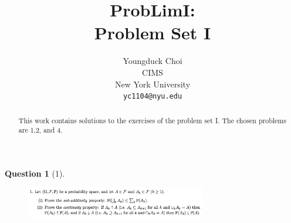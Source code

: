 \documentclass{article} %
\title{ProbLimI: \\
Problem Set I}
\author{
Youngduck Choi \\
CIMS \\
New York University\\
\texttt{yc1104@nyu.edu} \\
}
\theoremstyle{quest}
\newtheorem*{question}{Question}
\begin{document}
\maketitle

\begin{abstract}
This work contains solutions to the exercises of the problem set I. The
chosen problems are 1,2, and 4.
\end{abstract}

\bigskip

\begin{question}[1]
\hfill
\begin{figure}[h!]
  \centering
    \includegraphics[width=0.7\textwidth]{problim-e1-p1.png}
\end{figure}
\end{question}
\end{document}
